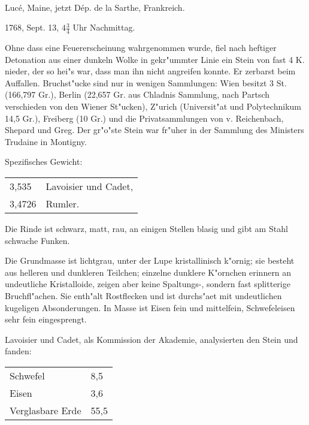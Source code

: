 \documentclass[a4paper, 11pt, oneside]{article}
\begin{document}
\paragraph{}
Lucé, Maine, jetzt Dép. de la Sarthe, Frankreich.

1768, Sept. 13, $\mathfrak{4\frac{3}{4}}$ Uhr Nachmittag.

Ohne dass eine Feuererscheinung wahrgenommen wurde, fiel nach heftiger Detonation aus einer dunkeln Wolke in gekr"ummter Linie ein Stein von fast 4 K. nieder, der so hei"s war, dass man ihn nicht angreifen konnte. Er zerbarst beim Auffallen. Bruchst"ucke sind nur in wenigen Sammlungen: Wien besitzt 3 St. (166,797 Gr.), Berlin (22,657 Gr. aus Chladnis Sammlung, nach Partsch verschieden von den Wiener St"ucken), Z"urich (Universit"at und Polytechnikum 14,5 Gr.), Freiberg (10 Gr.) und die Privatsammlungen von v. Reichenbach, Shepard und Greg. Der gr"o"ste Stein war fr"uher in der Sammlung des Ministers Trudaine in Montigny.

Spezifisches Gewicht:
\begin{table}[!ht]
    \centering\swabfamily\Large
    \begin{tabular}{l l}
        3,535 & Lavoisier und Cadet,\\
        3,4726 & Rumler.
    \end{tabular}
\end{table}

Die Rinde ist schwarz, matt, rau, an einigen Stellen blasig und gibt am Stahl schwache Funken.

Die Grundmasse ist lichtgrau, unter der Lupe kristallinisch k"ornig; sie besteht aus helleren und dunkleren Teilchen; einzelne dunklere K"ornchen erinnern an undeutliche Kristalloide, zeigen aber keine Spaltungs-, sondern fast splitterige Bruchfl"achen. Sie enth"alt Rostflecken und ist durchs"aet mit undeutlichen kugeligen Absonderungen. In Masse ist Eisen fein und mittelfein, Schwefeleisen sehr fein eingesprengt.

Lavoisier und Cadet, als Kommission der Akademie, analysierten den Stein und fanden:
\begin{table}[!ht]
    \centering\swabfamily\Large
    \begin{tabular}{l l}
        Schwefel & 8,5\\
        Eisen & 3,6\\
        Verglasbare Erde & 55,5
    \end{tabular}
\end{table}
\end{document}

